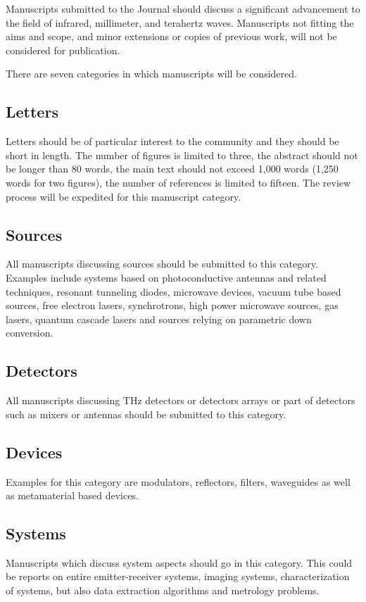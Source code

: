 \documentclass[smallextended]{svjour3}
\begin{document}
Manuscripts submitted to the Journal should discuss a significant advancement to the field of infrared, millimeter, and terahertz waves. Manuscripts not fitting the aims and scope, and minor extensions or copies of previous work, will not be considered for publication.

There are seven categories in which manuscripts will be considered.

\subsection{Letters}
Letters should be of particular interest to the community and they should be short in length. The number of figures is limited to three, the abstract should not be longer than 80 words, the main text should not exceed 1,000 words (1,250 words for two figures), the number of references is limited to fifteen. The review process will be expedited for this manuscript category.

\subsection{Sources}
All manuscripts discussing sources should be submitted to this category. Examples include systems based on photoconductive antennas and related techniques, resonant tunneling diodes, microwave devices, vacuum tube based sources, free electron lasers, synchrotrons, high power microwave sources, gas lasers, quantum cascade lasers and sources relying on parametric down conversion.

\subsection{Detectors}
All manuscripts discussing THz detectors or detectors arrays or part of detectors such as mixers or antennas should be submitted to this category.

\subsection{Devices}
Examples for this category are modulators, reflectors, filters, waveguides as well as metamaterial based devices.

\subsection{Systems}
Manuscripts which discuss system aspects should go in this category. This could be reports on entire emitter-receiver systems, imaging systems, characterization of systems, but also data extraction algorithms and metrology problems.
\end{document}
